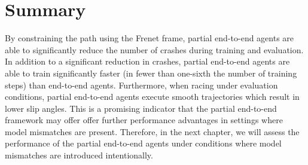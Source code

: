 \section{Summary}


By constraining the path using the Frenet frame, partial end-to-end agents are able to significantly reduce the number of crashes during training and evaluation.
In addition to a significant reduction in crashes, partial end-to-end agents are able to train significantly faster (in fewer than one-sixth the number of training steps) than end-to-end agents.
Furthermore, when racing under evaluation conditions, partial end-to-end agents execute smooth trajectories which result in lower slip angles.
This is a promising indicator that the partial end-to-end framework may offer offer further performance advantages in settings where model mismatches are present.
Therefore, in the next chapter, we will assess the performance of the partial end-to-end agents under conditions where model mismatches are introduced intentionally. 



